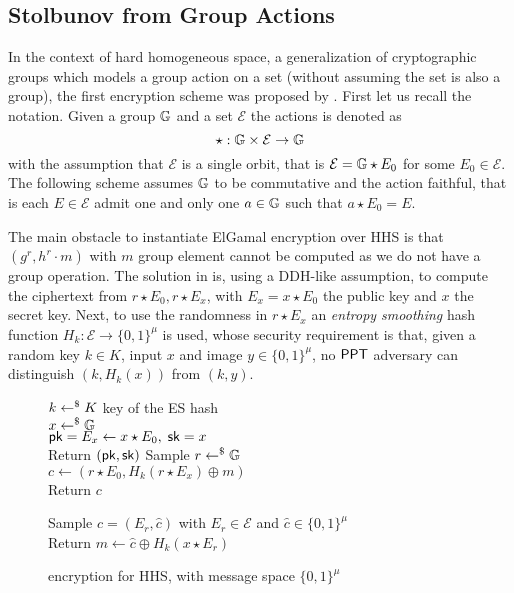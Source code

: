 \subsection{Stolbunov from Group Actions}

In the context of hard homogeneous space, a generalization of cryptographic groups which models a group action on a set (without assuming the set is also a group), the first encryption scheme was proposed by \cite{OTHER:Stolbunov10*}.
First let us recall the notation.
Given a group $\mathbb{G}$ and a set $\mathcal{E}$ the actions is denoted as
\[
	\star : \mathbb{G} \times \mathcal{E} \to \mathbb{G}
\]
with the assumption that $\mathcal{E}$ is a single orbit, that is $\mathcal{E} = \mathbb{G} \star E_0$ for some $E_0 \in \mathcal{E}$.
The following scheme assumes $\mathbb{G}$ to be commutative and the action faithful, that is each $E \in \mathcal{E}$ admit one and only one $a \in \mathbb{G}$ such that $a \star E_0 = E$.

The main obstacle to instantiate ElGamal encryption over HHS is that $(g^r, h^r \cdot m)$ with $m$ group element cannot be computed as we do not have a group operation.
The solution in \cite{OTHER:Stolbunov10*} is, using a DDH-like assumption, to compute the ciphertext from $r \star E_0, r \star E_x$, with $E_x = x \star E_0$ the public key and $x$ the secret key.
Next, to use the randomness in $r \star E_x$ an \textit{entropy smoothing} hash function $H_k : \mathcal{E} \to \{0, 1\}^\mu$ is used, whose security requirement is that, given a random key $k \in K$, input $x$ and image $y \in \{0, 1\}^\mu$, no $\mathsf{PPT}$ adversary can distinguish $(k, H_k(x))$ from $(k, y)$.


\begin{figure}[htb]
\centering
\begin{pcvstack}[center, space = 6pt]
\begin{pchstack}[center, space=12pt]
		{
			$k \gets^{\$} K$ key of the ES hash
				\\
			$x \gets^{\$} \mathbb{G}$
				\\
			$\mathsf{pk} = E_x \gets x \star E_0, \; \mathsf{sk} = x$
				\\
			Return $(\mathsf{pk}, \mathsf{sk})$
		}
		{
			Sample $r \gets^{\$} \mathbb{G}$
				\\
			$c \gets (r \star E_0, H_k(r \star E_x) \oplus m)$
				\\
			Return $c$
		}
\end{pchstack}
\begin{pchstack}[center]
		{
			Sample $c = (E_r, \hat{c})$ with $E_r \in \mathcal{E}$ and $\hat{c} \in \{0, 1\}^\mu$
				\\
			Return $m \gets \hat{c} \oplus H_k(x \star E_r)$
		}
\end{pchstack}
\end{pcvstack}
\label{prot:Stolbunov10}
\caption{\cite{OTHER:Stolbunov10} encryption for HHS, with message space $\{0, 1\}^\mu$}
\end{figure}

